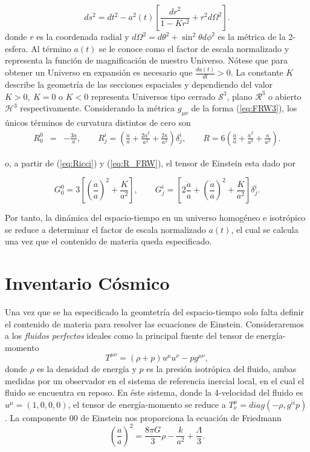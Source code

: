 \documentclass[10.5pt,prb,
               showpacs,            %
               preprintnumbers,     %
               aps,                 %
               prl,          	    %
               letterpaper,             %
               superscriptaddress,      %
               nofootinbib,         %
               tightenlines,        %
               floats,floatfix      %
               ,usenatbib]{revtex4-1}%
\def\beq{\begin{equation}}
\def\eeq{\end{equation}}
\begin{document}
	\beq \label{eq:FRW3}
		ds^2 = dt^2 - a^2(t)\left[\frac{dr^2}{1-Kr^2} + r^2d\Omega^2 \right].
	\eeq
%
donde $r$ es la coordenada radial y $d\Omega^2 = d\theta^2 + \sin^2 \theta d\phi^2$ es la m\'etrica de la 2-esfera. 
Al t\'ermino $a(t)$ se le conoce como el factor de escala normalizado y representa la funci\'on 
de magnificaci\'on de nuestro Universo. N\'otese que para obtener un Universo en expansi\'on 
es necesario que $\frac{d a(t)}{dt}>0$. La constante $K$ describe la geometr\'ia de las secciones espaciales 
y dependiendo del valor $K>0,~ K=0$ o $K<0$
representa Universos tipo cerrado $\mathcal{S}^3$, plano $\mathcal{R}^3$ o abierto $\mathcal{H}^3$  respectivamente.
%
Considerando la m\'etrica $g_{\mu \nu}$ de la forma (\ref{eq:FRW3}), los \'unicos t\'erminos de curvatura distintos de cero son
%
	\begin{eqnarray} \label{eq:R_FRW}
		R^0_0 &=& -\frac{3\ddot a}{a},\label{eq:curvs1}  \qquad
		R^i_j = \left(\frac{\ddot a}{a}+\frac{2\dot a^2}{a^2} +
				  \frac{2\kappa}{a^2} \right)\delta^i_j, \label{eq:R2} \qquad
		R     = 6 \left(\frac{\ddot a}{a} +\frac{\dot a^2}{a^2}+ 
				  \frac{\kappa}{a^2} \right). \label{eq:R3}
	\end{eqnarray}

o,  a partir de (\ref{eq:Ricci}) y (\ref{eq:R_FRW}), el tensor de Einstein esta dado por

	\begin{equation}
		G^0_0 = 3 \left[ \left( \frac{\dot a}{a} \right)^2 + \frac{K}{a^2} \right], \qquad 
				G^i_j =\left[2\frac{\ddot a}{a} + \left( \frac{\dot a}{a} \right)^2  + \frac{K}{a^2}\right]\delta^i_j.
	\end{equation}

Por tanto, la din\'amica del espacio-tiempo en un universo homog\'eneo e isotr\'opico se reduce a determinar
el factor de escala normalizado $a(t)$, el cual se calcula una vez que el contenido de materia queda especificado.


\section{Inventario C\'osmico}


Una vez que se ha especificado la geomtetr\'ia del espacio-tiempo solo falta definir el contenido de materia  
para resolver las ecuaciones de Einstein. 
Consideraremos a los \textit{fluidos perfectos} ideales como la principal fuente del tensor
de energ\'ia-momento
%
	\beq
		T^{\mu \nu} = (\rho + p)u^\mu u^\nu - p g^{\mu \nu},
	\eeq
%
donde $\rho$ es la densidad de energ\'ia y $p$ es la presi\'on isotr\'opica del fluido, ambas
medidas por un observador en el sistema de referencia inercial local, en el cual el fluido
se encuentra en reposo. En \'este sistema, donde la 4-velocidad del fluido es $u^{\mu}=(1,0,0,0)$,
el tensor de energ\'ia-momento se reduce a $T^{\mu}_\nu=diag(-\rho, g^{ii}p)$. 
%
La componente $00$ de Einstein nos proporciona la ecuaci\'on de Friedmann
%
	\beq \label{eq:Fried}
		\left(\frac{\dot a}{a}\right)^2 = \frac{8\pi G}{3} \rho - \frac{k}{a^2} + \frac{\Lambda}{3}.
	\eeq
\end{document}
